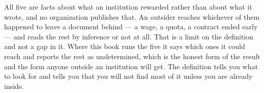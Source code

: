 All five are facts about what an institution rewarded rather than about what it wrote, and no organization publishes that. An outsider reaches whichever of them happened to leave a document behind — a wage, a quota, a contract ended early — and reads the rest by inference or not at all. That is a limit on the definition and not a gap in it. Where this book runs the five it says which ones it could reach and reports the rest as undetermined, which is the honest form of the result and the form anyone outside an institution will get. The definition tells you what to look for and tells you that you will not find most of it unless you are already inside.
